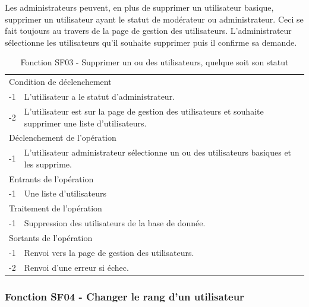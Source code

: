 \documentclass[a4paper]{article}
\begin{document}
Les administrateurs peuvent, en plus de supprimer un utilisateur basique, supprimer un utilisateur ayant le statut de modérateur ou administrateur. Ceci se fait toujours au travers de la page de gestion des utilisateurs. L'administrateur sélectionne les utilisateurs qu'il souhaite supprimer puis il confirme sa demande.

\begin{table}[H]
  \centering
   \small
	\begin{tabular}{|c|p{12cm}|}
   		\hline
   			\rowcolor{lightgray}\multicolumn{2}{|c|}{\textbf{Fonction SF03 - Supprimer un ou des utilisateurs}} \\
   		\hline
   			\multicolumn{2}{|l|}{Condition de déclenchement} \\
   		\hline
   			-1 & L'utilisateur a le statut d'administrateur.\\
        			-2 & L'utilisateur est sur la page de gestion des utilisateurs et souhaite supprimer une liste d'utilisateurs.\\
   		\hline
   			\multicolumn{2}{|l|}{Déclenchement de l'opération} \\
   		\hline
   			-1 & L'utilisateur administrateur sélectionne un ou des utilisateurs basiques et les supprime.\\
   		\hline
   			\multicolumn{2}{|l|}{Entrants de l'opération} \\
   		\hline
   			-1 & Une liste d'utilisateurs\\
   		\hline
   			\multicolumn{2}{|l|}{Traitement de l'opération} \\
  		\hline
   			-1 & Suppression des utilisateurs de la base de donnée.\\
   		\hline
   			\multicolumn{2}{|l|}{Sortants de l'opération} \\
   		\hline
   			-1 & Renvoi vers la page de gestion des utilisateurs.\\
        			-2 & Renvoi d'une erreur si échec.\\ 
   		\hline
	\end{tabular}
  \caption{Fonction SF03 - Supprimer un ou des utilisateurs, quelque soit son statut}
  \normalsize
  \label{tab: supprimmer_utilisateur}
\end{table}

\subsubsection{Fonction SF04 - Changer le rang d'un utilisateur}
\end{document}
